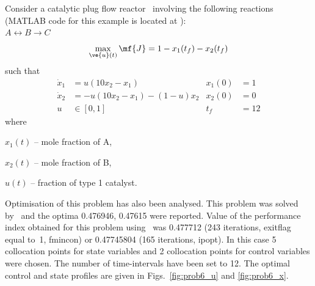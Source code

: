 Consider a catalytic plug flow reactor~\citep{raj01,dad95} involving
the following reactions (MATLAB code for this example is located at
):\\ 
$A \leftrightarrow B\rightarrow C$
\begin{equation}
\max_{\ve{u}(t)} \mf{J} = 1-x_{1}(t_{f})-x_{2}(t_{f})
\label{eq:plugflow} 
\end{equation}
such that
\begin{align*}
\dot{x}_1&=u(10x_2-x_1) &x_1(0) &= 1 \\
\dot{x}_2&=-u(10x_2-x_1)-(1-u)x_2  &x_2(0) &= 0 \\
u &\in [0,1] & t_f &=12
\end{align*}
where
\begin{description}
\item $x_1(t)$ -- mole fraction of A,
\item $x_2(t)$ -- mole fraction of B,
\item $u(t)$ -- fraction of type 1 catalyst.
\end{description}

Optimisation of this problem has also been analysed. This problem was
solved by~\cite{log89,raj01} and the optima 0.476946, 0.47615 were
reported. Value of the performance index obtained for this problem
using~ was 0.477712 (243 iterations, exitflag equal to~1,
fmincon) or 0.47745804 (165 iterations, ipopt). In this case
5 collocation points for state variables and 2 collocation points for
control variables were chosen. The number of time-intervals have been
set to 12. The optimal control and state profiles are given in
Figs.~\ref{fig:prob6_u} and \ref{fig:prob6_x}.

